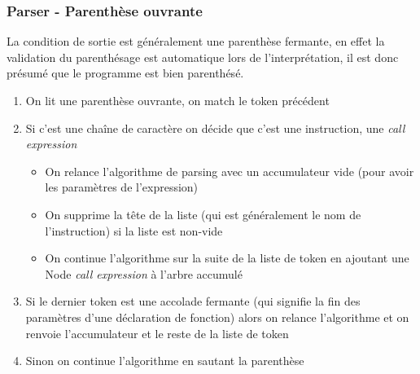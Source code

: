 \documentclass{beamer}
\begin{document}
    \begin{frame}
        \frametitle{Parser - Parenthèse ouvrante}
        La condition de sortie est généralement une parenthèse fermante, en effet la validation du parenthésage est automatique lors de l'interprétation,
        il est donc présumé que le programme est bien parenthésé.
        \begin{enumerate}
            \item<1> On lit une parenthèse ouvrante, on match le token précédent
            \item<2> Si c'est une chaîne de caractère on décide que c'est une instruction, une \textit{call expression}
            \begin{itemize}
                \item<2> On relance l'algorithme de parsing avec un accumulateur vide (pour avoir les paramètres de l'expression)
                \item<2> On supprime la tête de la liste (qui est généralement le nom de l'instruction) si la liste est non-vide 
                \item<2> On continue l'algorithme sur la suite de la liste de token en ajoutant une Node \textit{call expression} à l'arbre accumulé
            \end{itemize}
            \item<3> Si le dernier token est une accolade fermante (qui signifie la fin des paramètres d'une déclaration de fonction) alors on 
            relance l'algorithme et on renvoie l'accumulateur et le reste de la liste de token
            \item<4> Sinon on continue l'algorithme en sautant la parenthèse
        \end{enumerate} 
    \end{frame}
\end{document}

